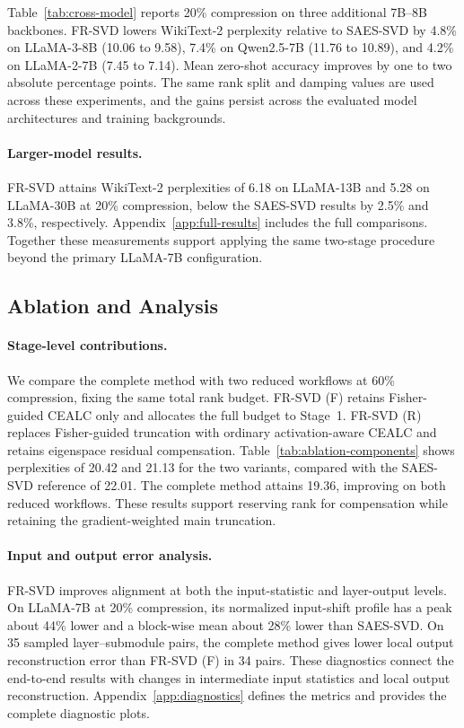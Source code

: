 \documentclass[11pt]{article}
\begin{document}
Table~\ref{tab:cross-model} reports 20\% compression on three additional 7B--8B backbones. FR-SVD lowers WikiText-2 perplexity relative to SAES-SVD by 4.8\% on LLaMA-3-8B (10.06 to 9.58), 7.4\% on Qwen2.5-7B (11.76 to 10.89), and 4.2\% on LLaMA-2-7B (7.45 to 7.14). Mean zero-shot accuracy improves by one to two absolute percentage points. The same rank split and damping values are used across these experiments, and the gains persist across the evaluated model architectures and training backgrounds.


\paragraph{Larger-model results.}
FR-SVD attains WikiText-2 perplexities of 6.18 on LLaMA-13B and 5.28 on LLaMA-30B at 20\% compression, below the SAES-SVD results by 2.5\% and 3.8\%, respectively. Appendix~\ref{app:full-results} includes the full comparisons. Together these measurements support applying the same two-stage procedure beyond the primary LLaMA-7B configuration.

\subsection{Ablation and Analysis}\label{sec:ablation}

\paragraph{Stage-level contributions.}

We compare the complete method with two reduced workflows at 60\% compression, fixing the same total rank budget. FR-SVD (F) retains Fisher-guided CEALC only and allocates the full budget to Stage~1. FR-SVD (R) replaces Fisher-guided truncation with ordinary activation-aware CEALC and retains eigenspace residual compensation. Table~\ref{tab:ablation-components} shows perplexities of 20.42 and 21.13 for the two variants, compared with the SAES-SVD reference of 22.01. The complete method attains 19.36, improving on both reduced workflows. These results support reserving rank for compensation while retaining the gradient-weighted main truncation.



\paragraph{Input and output error analysis.}
FR-SVD improves alignment at both the input-statistic and layer-output levels. On LLaMA-7B at 20\% compression, its normalized input-shift profile has a peak about 44\% lower and a block-wise mean about 28\% lower than SAES-SVD. On 35 sampled layer--submodule pairs, the complete method gives lower local output reconstruction error than FR-SVD (F) in 34 pairs. These diagnostics connect the end-to-end results with changes in intermediate input statistics and local output reconstruction. Appendix~\ref{app:diagnostics} defines the metrics and provides the complete diagnostic plots.
\end{document}
